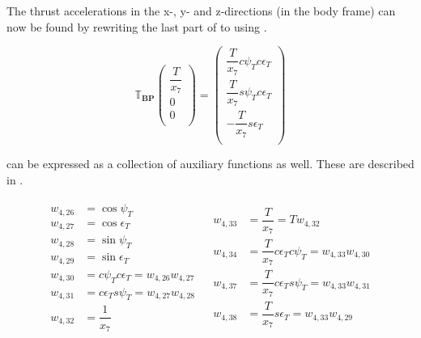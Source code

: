 \noindent
The thrust accelerations in the x-, y- and z-directions (in the body frame) can now be found by rewriting the last part of  to  using .

\begin{equation} \label{eq:aTB}
\mathbb{T}_{\mathbf{BP}}
\begin{pmatrix}
\dfrac{T}{x_{7}}\\
0\\
0\\
\end{pmatrix}
=
\begin{pmatrix}
\dfrac{T}{x_{7}}c\psi_{T}c\epsilon_{T}\\
\dfrac{T}{x_{7}}s\psi_{T}c\epsilon_{T}\\
-\dfrac{T}{x_{7}}s\epsilon_{T}\\
\end{pmatrix}
\end{equation}


\noindent
{} can be expressed as a collection of auxiliary functions as well. These are described in .

\begin{align} \label{eq:aTBAuxF}
\begin{split}
w_{4,26} &= \cos \psi_{T} \\
w_{4,27} &= \cos \epsilon_{T} \\
w_{4,28} &= \sin \psi_{T} \\
w_{4,29} &= \sin \epsilon_{T} \\
w_{4,30} &= c\psi_{T} c\epsilon_{T} = w_{4,26}w_{4,27} \\
w_{4,31} &= c\epsilon_{T} s\psi_{T} = w_{4,27}w_{4,28} \\
w_{4,32} &= \dfrac{1}{x_{7}}\\
\end{split}
&
\begin{split}
w_{4,33} &= \dfrac{T}{x_{7}} = T w_{4,32}\\
w_{4,34} &= \dfrac{T}{x_{7}} c\epsilon_{T} c\psi_{T} = w_{4,33}w_{4,30} \\
w_{4,37} &= \dfrac{T}{x_{7}}c\epsilon_{T} s\psi_{T} = w_{4,33}w_{4,31} \\
w_{4,38} &= \dfrac{T}{x_{7}} s\epsilon_{T} = w_{4,33}w_{4,29} \\
\end{split}
\end{align}

